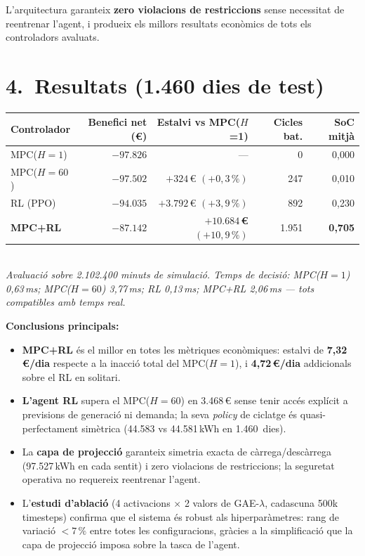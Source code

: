\documentclass[a4paper,11pt]{article}
\begin{document}
L'arquitectura garanteix \textbf{zero violacions de restriccions} sense
necessitat de reentrenar l'agent, i produeix els millors resultats econòmics
de tots els controladors avaluats.

\section*{4.\ Resultats (1.460 dies de test)}

\begin{table}[h]
\centering
\small
\begin{tabular}{@{}lrrrr@{}}
\toprule
\textbf{Controlador} & \textbf{Benefici net (€)} &
  \textbf{Estalvi vs MPC($H$=1)} & \textbf{Cicles bat.} &
  \textbf{SoC mitjà} \\
\midrule
MPC($H=1$)      & $-97.826$ & ---                         & 0    & 0{,}000 \\
MPC($H=60$)     & $-97.502$ & $+324$\,€\; $(+0{,}3\,\%)$ & 247  & 0{,}010 \\
RL (PPO)        & $-94.035$ & $+3.792$\,€\; $(+3{,}9\,\%)$& 892  & 0{,}230 \\
\textbf{MPC+RL} & $\mathbf{-87.142}$ &
  $\mathbf{+10.684}$\,\textbf{€\; $(+10{,}9\,\%)$} &
  1.951 & \textbf{0{,}705} \\
\bottomrule
\end{tabular}
\medskip\\
\footnotesize
\textit{Avaluació sobre 2.102.400 minuts de simulació.
Temps de decisió: MPC($H=1$) 0,63\,ms; MPC($H=60$) 3,77\,ms;
RL 0,13\,ms; MPC+RL 2,06\,ms — tots compatibles amb temps real.}
\end{table}

\textbf{Conclusions principals:}

\begin{itemize}
  \item \textbf{MPC+RL} és el millor en totes les mètriques econòmiques:
    estalvi de \textbf{7,32\,€/dia} respecte a la inacció total del
    MPC($H=1$), i \textbf{4,72\,€/dia} addicionals sobre el RL en solitari.

  \item \textbf{L'agent RL} supera el MPC($H=60$) en 3.468\,€ sense tenir
    accés explícit a previsions de generació ni demanda; la seva \textit{policy}
    de ciclatge és quasi-perfectament simètrica
    (44.583 vs 44.581\,kWh en 1.460~dies).

  \item La \textbf{capa de projecció} garanteix simetria exacta de
    càrrega/descàrrega (97.527\,kWh en cada sentit) i zero violacions de
    restriccions; la seguretat operativa no requereix reentrenar l'agent.

  \item L'\textbf{estudi d'ablació} (4 activacions $\times$ 2 valors de
    GAE-$\lambda$, cadascuna 500k timesteps) confirma que el sistema és
    robust als hiperparàmetres: rang de variació $<7\,\%$ entre totes
    les configuracions, gràcies a la simplificació que la capa de
    projecció imposa sobre la tasca de l'agent.
\end{itemize}
\end{document}
